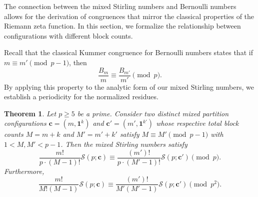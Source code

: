 \documentclass[12pt]{amsart}
\newtheorem{theorem}{Theorem}[section]
\theoremstyle{definition}
\begin{document}
The connection between the mixed Stirling numbers and Bernoulli numbers allows for the derivation of congruences that mirror the classical properties of the Riemann zeta function. In this section, we formalize the relationship between configurations with different block counts.

Recall that the classical Kummer congruence for Bernoulli numbers states that if $m \equiv m' \pmod{p-1}$, then
\begin{equation*}
    \frac{B_m}{m} \equiv \frac{B_{m'}}{m'} \pmod p.
\end{equation*}
By applying this property to the analytic form of our mixed Stirling numbers, we establish a periodicity for the normalized residues.

\begin{theorem}
\label{thm:kummer_mixed_unified}
Let $p \ge 5$ be a prime. Consider two distinct mixed partition configurations $\mathbf{c} = (m, \mathbf{1}^k)$ and $\mathbf{c'} = (m', \mathbf{1}^{k'})$ whose respective total block counts $M = m+k$ and $M' = m'+k'$ satisfy $M \equiv M' \pmod{p-1}$ with $1 < M, M' < p-1$. Then the mixed Stirling numbers satisfy
    \begin{equation*}
        \frac{m!}{p \cdot (M-1)!} \mathcal{S}(p; \mathbf{c}) \equiv \frac{(m')!}{p \cdot (M'-1)!} \mathcal{S}(p; \mathbf{c'}) \pmod p.
    \end{equation*}
    Furthermore,
    \begin{equation*}
        \frac{m!}{M!(M-1)} \mathcal{S}(p; \mathbf{c}) \equiv \frac{(m')!}{M'(M'-1)} \mathcal{S}(p; \mathbf{c'}) \pmod{p^2}.
    \end{equation*}
\end{theorem}
\end{document}
